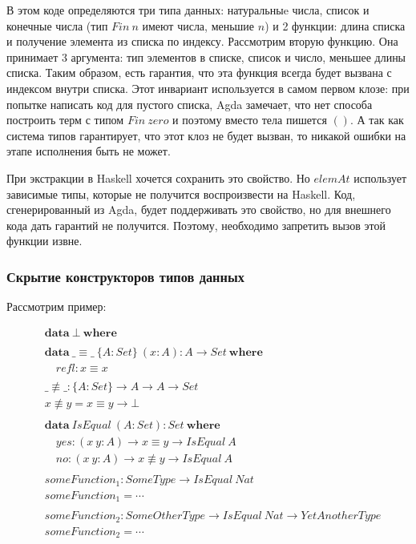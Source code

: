 В этом коде определяются три типа данных: натуральныe числа,
список и конечные числа (тип \(Fin\ n\) имеют числа, меньшие \(n\)) и
2 функции: длина списка и получение элемента из списка по индексу.
Рассмотрим вторую функцию. Она принимает 3 аргумента: тип элементов
в списке, список и число, меньшее длины списка. Таким образом, есть
гарантия, что эта функция всегда будет вызвана с индексом внутри списка.
Этот инвариант используется в самом первом клозе:
при попытке написать код для пустого списка, Agda замечает, что нет способа
построить терм с типом \(Fin\ zero\) и поэтому вместо тела пишется \(()\).
А так как система типов гарантирует, что этот клоз не будет вызван, то
никакой ошибки на этапе исполнения быть не может.

При экстракции в Haskell хочется сохранить это свойство. Но \(elemAt\)
использует зависимые типы, которые не получится воспроизвести на Haskell.
Код, сгенерированный из Agda, будет поддерживать это свойство, но для
внешнего кода дать гарантий не получится. Поэтому, необходимо запретить
вызов этой функции извне.

\subsubsection{Скрытие конструкторов типов данных}

Рассмотрим пример:

\begin{align*}
&\mathbf{data}\ \bot\ \mathbf{where}\\
\\
&\mathbf{data}\ \_\equiv\_\ \{A : Set\}\ (x : A) : A \rightarrow Set\ \mathbf{where}\\
&\quad refl : x \equiv x\\
\\
&\_\not\equiv\_ : \{A : Set\} \rightarrow A \rightarrow A \rightarrow Set\\
&x \not\equiv y = x \equiv y \rightarrow \bot\\
\\
&\mathbf{data}\ IsEqual\ (A : Set) : Set\ \mathbf{where}\\
&\quad yes : (x\ y : A) \rightarrow x \equiv y \rightarrow IsEqual\ A\\
&\quad no : (x\ y : A) \rightarrow x \not\equiv y \rightarrow IsEqual\ A\\
\\
&someFunction_1 : SomeType \rightarrow IsEqual\ Nat\\
&someFunction_1 = \cdots\\
\\
&someFunction_2 : SomeOtherType \rightarrow IsEqual\ Nat \rightarrow YetAnotherType\\
&someFunction_2 = \cdots
\end{align*}

